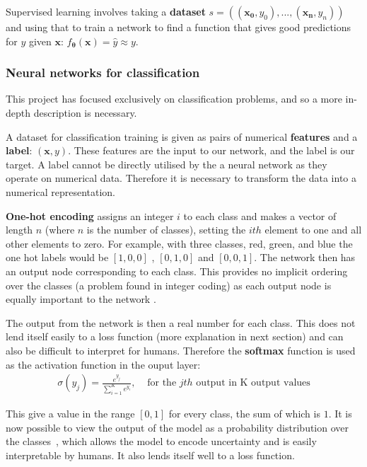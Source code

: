 \documentclass[12pt,a4paper,twoside,openright]{report}
\renewcommand{\vec}[1]{\bm{#1}}
\begin{document}
Supervised learning involves taking a \textbf{dataset} $s=((\vec{x_0}, y_0),...,(\vec{x_n}, y_n))$ and using that to train a network to find a function 
that gives good predictions for $y$ given $\vec{x}$: $f_{\vec{\theta}}(\vec{x}) = \hat{y} \approx y$.

\subsubsection{Neural networks for classification}
This project has focused exclusively on classification problems, and so a more in-depth description is necessary.

A dataset for classification training is given as pairs of numerical \textbf{features} and a \textbf{label}: $(\vec{x}, y)$. These features are the input to our network,
and the label is our target. A label cannot be directly utilised by the a neural network as they operate on numerical data. Therefore it is 
necessary to transform the data into a numerical representation.

\textbf{One-hot encoding} assigns an integer $i$ to each class and makes a vector of length $n$ (where $n$ is the 
number of classes), setting the $ith$ element to one and all other elements to zero. For example, with three classes, red, green, and blue
the one hot labels would be $[1, 0, 0]$ , $[0, 1, 0]$ and $[0, 0, 1]$. The network then has an output node corresponding to each class.
This provides no implicit ordering over the classes (a problem found in integer coding) as each output node is equally important to the 
network \cite{WhyOneHo55:online}.

The output from the network is then a real number for each class. This does not lend itself easily to a loss function (more explanation
in next section) and can also be difficult to interpret for humans. Therefore the \textbf{softmax} function is used as the activation function
in the ouput layer:
\begin{align} \label{softmax}
  \sigma(y_j) = \frac{e^{y_j}}{\sum_{i=1}^{K} e^{y_i}},  &\text{ for the $jth$ output in K output values}
\end{align}

This give a value in the range $[0,1]$ for every class, the sum of which is $1$. It is now possible to view the output of the model as a 
probability distribution over the classes~\cite{10.1007/978-3-642-76153-9_28}, which allows the model to encode uncertainty and is easily interpretable by humans. It also lends 
itself well to a loss function.
\end{document}
